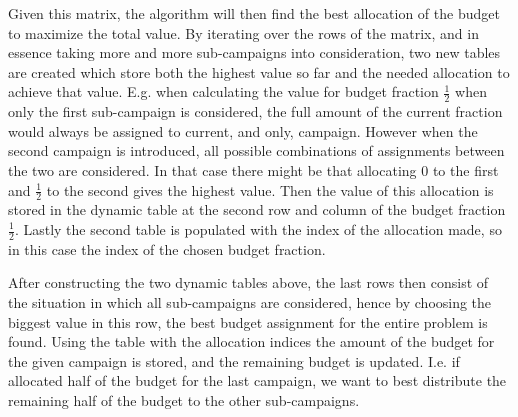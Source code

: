 Given this matrix, the algorithm will then find the best allocation of the budget to maximize the total value. By iterating over the rows of the matrix, and in essence taking more and more sub-campaigns into consideration, two new tables are created which store both the highest value so far and the needed allocation to achieve that value. E.g. when calculating the value for budget fraction $\frac{1}{2}$ when only the first sub-campaign is considered, the full amount of the current fraction would always be assigned to current, and only, campaign. However when the second campaign is introduced, all possible combinations of assignments between the two are considered. In that case there might be that allocating $0$ to the first and $\frac{1}{2}$ to the second gives the highest value. Then the value of this allocation is stored in the dynamic table at the second row and column of the budget fraction $\frac{1}{2}$. Lastly the second table is populated with the index of the allocation made, so in this case the index of the chosen budget fraction.

After constructing the two dynamic tables above, the last rows then consist of the situation in which all sub-campaigns are considered, hence by choosing the biggest value in this row, the best budget assignment for the entire problem is found. Using the table with the allocation indices the amount of the budget for the given campaign is stored, and the remaining budget is updated. I.e. if allocated half of the budget for the last campaign, we want to best distribute the remaining half of the budget to the other sub-campaigns.
